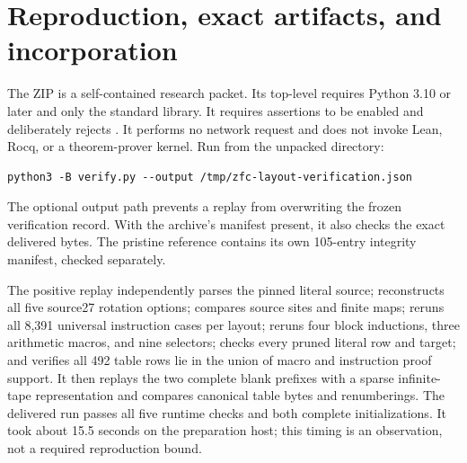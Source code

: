 \section{Reproduction, exact artifacts, and incorporation}

The ZIP is a self-contained research packet. Its top-level
 requires Python 3.10 or later and only the standard
library. It requires assertions to be enabled and deliberately rejects
. It performs no network request and does not invoke
Lean, Rocq, or a theorem-prover kernel. Run from the unpacked directory:
\begin{lstlisting}
python3 -B verify.py --output /tmp/zfc-layout-verification.json
\end{lstlisting}
The optional output path prevents a replay from overwriting the frozen
verification record. With the archive's manifest present, it also checks
the exact delivered bytes. The pristine reference contains its own
105-entry integrity manifest, checked separately.

The positive replay independently parses the pinned literal source;
reconstructs all five source27 rotation options; compares source sites
and finite maps; reruns all 8,391 universal instruction cases per layout;
reruns four block inductions, three arithmetic macros, and nine selectors;
checks every pruned literal row and target; and verifies all 492 table
rows lie in the union of macro and instruction proof support. It then
replays the two complete blank prefixes with a sparse infinite-tape
representation and compares canonical table bytes and renumberings.
The delivered run passes all five runtime checks and both complete
initializations. It took about 15.5 seconds on the preparation host;
this timing is an observation, not a required reproduction bound.


